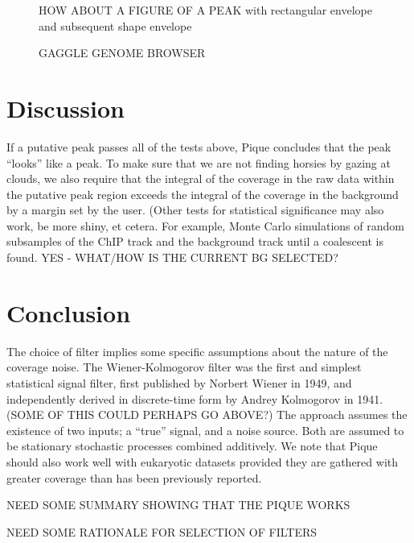 \documentclass{bioinfo}
\begin{document}
{\begin{methods}
\end{methods}

\begin{figure}[!tfbd peak - a nice one]%
\caption{HOW ABOUT A FIGURE OF A PEAK with rectangular envelope and subsequent shape envelope}\label{fig:01}
\end{figure}

\begin{figure}[!tfbd data - reasonable spot showing curation]%
\caption{GAGGLE GENOME BROWSER}\label{fig:02}
\end{figure}
\section{Discussion}

If a putative peak passes all of the tests above, Pique concludes that
the peak ``looks'' like a peak. To make sure that we are not finding
horsies by gazing at clouds, we also require that the integral of the
coverage in the raw data within the putative peak region exceeds the
integral of the coverage in the background by a margin set by the
user. (Other tests for statistical significance may also work, be more
shiny, et cetera. For example, Monte Carlo simulations of random
subsamples of the ChIP track and the background track until a
coalescent is found. YES - WHAT/HOW IS THE CURRENT BG SELECTED?


\section{Conclusion}
The choice of filter implies some specific assumptions about the
nature of the coverage noise. The Wiener-Kolmogorov filter was the
first and simplest statistical signal filter, first published by
Norbert Wiener in 1949, and independently derived in discrete-time
form by Andrey Kolmogorov in 1941. (SOME OF THIS COULD PERHAPS GO ABOVE?) The approach assumes the existence
of two inputs; a ``true'' signal, and a noise source. Both are assumed
to be stationary stochastic processes combined additively. We note that Pique should also work well with eukaryotic datasets provided they are gathered with greater coverage than has been previously reported.  

NEED SOME SUMMARY SHOWING THAT THE PIQUE WORKS

NEED SOME RATIONALE FOR SELECTION OF FILTERS

}
\end{document}
